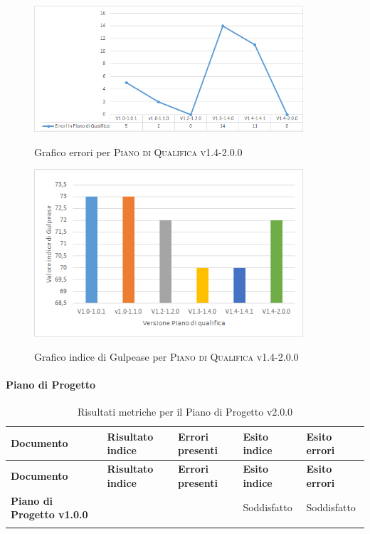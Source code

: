 \documentclass[../piano-di-qualifica.tex]{subfiles}
\begin{document}
\begin{figure}[H]
  \centering
  \includegraphics[width=10cm]{img/erroriPdQV1.4-2.0.0.png}
  \label{fig:errori_pdq}
  \caption{Grafico errori per \textsc{Piano di Qualifica v1.4-2.0.0}}
\end{figure}

\begin{figure}[H]
  \centering
  \includegraphics[width=10cm]{img/GulpeasePdQV1.4-2.0.0.png}
  \label{fig:gulpease_pdq}
  \caption{Grafico indice di Gulpease per \textsc{Piano di Qualifica v1.4-2.0.0}}
\end{figure}


\paragraph{Piano di Progetto}
\label{sub:piano_di_progetto}

\renewcommand{\arraystretch}{2} %
\begin{longtable}[H]{>{\centering\bfseries}m{6cm} >{\centering}m{2cm} >{\centering}m{2.5cm} >{\centering}m{2.5cm} >{\centering\arraybackslash}m{2.5cm}}  
  \rowcolor{lightgray}
  {\textbf{Documento}} & {\textbf{Risultato indice}} & {\textbf{Errori presenti}} & {\textbf{Esito indice}} & {\textbf{Esito errori}}  \\
  \endfirsthead%
  \rowcolor{lightgray}
  {\textbf{Documento}} & {\textbf{Risultato indice}} & {\textbf{Errori presenti}} & {\textbf{Esito indice}} & {\textbf{Esito errori}}  \\
  \endhead%
  \textbf{Piano di Progetto v1.0.0} & 74                 & 0               & Soddisfatto & Soddisfatto \\
  \caption{Risultati metriche per il Piano di Progetto v2.0.0}
  \label{tab:my-table}
\end{longtable}
\end{document}

